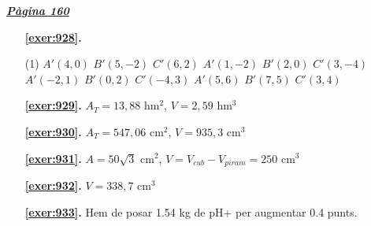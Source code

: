 \hyperlink{page.160}{\textbf{\em Pàgina 160}}
\begin{enumerate}



 \item[\fontfamily{phv}\selectfont\color{blue}\textbf{\ref{exer:928}. }] \label{ans:928}
 \begin{tasks}[column-sep=1em, item-indent=1.3333em](1)
	 \task $A'(4,0)$ $B'(5,-2)$ $C'(6,2)$
	 \task* $A'(1,-2)$ $B'(2,0)$ $C'(3,-4)$
	 \task* $A'(-2,1)$ $B'(0,2)$ $C'(-4,3)$
	 \task $A'(5,6)$ $B'(7,5)$ $C'(3,4)$
\end{tasks}
 \end{enumerate}
\begin{enumerate}
\item[\fontfamily{phv}\selectfont\color{blue}\textbf{\ref{exer:929}. }] \label{ans:929} 
$A_T =13,88$ hm$^{2}$, $V=2,59$ hm$^3$
\item[\fontfamily{phv}\selectfont\color{blue}\textbf{\ref{exer:930}. }] \label{ans:930} 
$A_T =547,06$ cm$^{2}$, $V=935,3$ cm$^3$
\item[\fontfamily{phv}\selectfont\color{blue}\textbf{\ref{exer:931}. }] \label{ans:931} 
$A=50\sqrt {3}$ cm$^{2}$, $V=V_{cub} -V_{piram}=250$ cm$^{3}$
\item[\fontfamily{phv}\selectfont\color{blue}\textbf{\ref{exer:932}. }] \label{ans:932} 
$V=338,7$ cm$^3$
\item[\fontfamily{phv}\selectfont\color{blue}\textbf{\ref{exer:933}. }] \label{ans:933} 
Hem de posar 1.54 kg de pH+ per augmentar 0.4 punts.
 \end{enumerate}